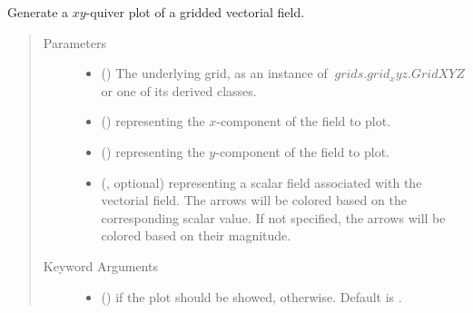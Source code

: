 \documentclass[letterpaper,10pt,english]{sphinxmanual}
\begin{document}
\begin{fulllineitems}
\label{\detokenize{api:utils.utils_plot.quiver_xy}}
Generate a \(xy\)-quiver plot of a gridded vectorial field.
\begin{quote}\begin{description}
\item[{Parameters}] \leavevmode\begin{itemize}
\item {} 
 () \textendash{} The underlying grid, as an instance of \(~grids.grid_xyz.GridXYZ\) or one of its derived classes.

\item {} 
 () \textendash{}  representing the \(x\)-component of the field to plot.

\item {} 
 () \textendash{}  representing the \(y\)-component of the field to plot.

\item {} 
 (, optional) \textendash{}  representing a scalar field associated with the vectorial field.
The arrows will be colored based on the corresponding scalar value. If not specified, the arrows will be colored
based on their magnitude.

\end{itemize}

\item[{Keyword Arguments}] \leavevmode\begin{itemize}
\item {} 
 () \textendash{}  if the plot should be showed,  otherwise. Default is .


\end{itemize}
\end{description}
\end{quote}
\end{fulllineitems}
\end{document}
